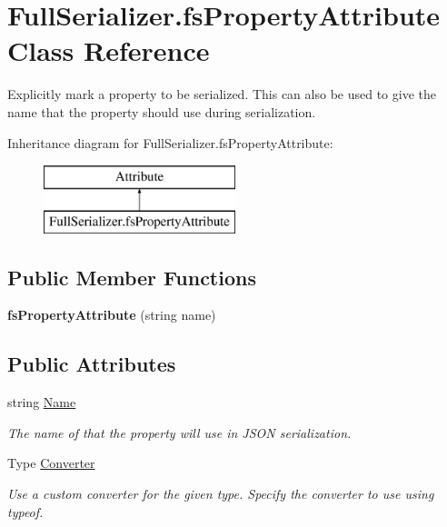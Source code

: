 \hypertarget{class_full_serializer_1_1fs_property_attribute}{}\section{Full\+Serializer.\+fs\+Property\+Attribute Class Reference}
\label{class_full_serializer_1_1fs_property_attribute}


Explicitly mark a property to be serialized. This can also be used to give the name that the property should use during serialization.  


Inheritance diagram for Full\+Serializer.\+fs\+Property\+Attribute\+:\begin{figure}[H]
\begin{center}
\leavevmode
\includegraphics[height=2.000000cm]{class_full_serializer_1_1fs_property_attribute}
\end{center}
\end{figure}
\subsection*{Public Member Functions}
\begin{DoxyCompactItemize}
\item 
\mbox{\label{class_full_serializer_1_1fs_property_attribute_a2ea92a57d2bba0030b7dd6cd5b1d04f7}} 
{\bfseries fs\+Property\+Attribute} (string name)
\end{DoxyCompactItemize}
\subsection*{Public Attributes}
\begin{DoxyCompactItemize}
\item 
string \hyperlink{class_full_serializer_1_1fs_property_attribute_ab1b4b66609dc00829628f6d8f07be273}{Name}
\begin{DoxyCompactList}\small\item\em The name of that the property will use in J\+S\+ON serialization. \end{DoxyCompactList}\item 
Type \hyperlink{class_full_serializer_1_1fs_property_attribute_aaaf462a84a2ab5cdca315894a11033bc}{Converter}
\begin{DoxyCompactList}\small\item\em Use a custom converter for the given type. Specify the converter to use using typeof. \end{DoxyCompactList}\end{DoxyCompactItemize}


